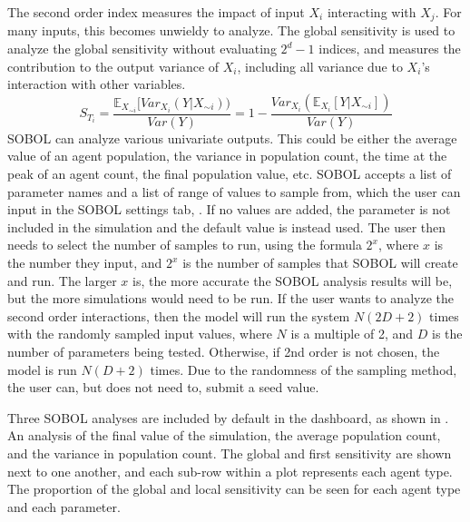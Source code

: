 The second order index measures the impact of input $X_i$ interacting with $X_j$. For many inputs, this becomes unwieldy to analyze.
The global sensitivity is used to analyze the global sensitivity without evaluating $2^d-1$ indices, and measures the contribution to the output variance of $X_i$, including all variance due to $X_i$'s interaction with other variables.
\[
    S_{T_i} = \frac{\mathbb{E}_{X_{\sim i}}[\textit{Var}_{X_i}(Y|X_{\sim i}))}{\textit{Var}(Y)} = 1 - \frac{\textit{Var}_{X_i}(\mathbb{E}_{X_i}[Y|X_{\sim i}])}{\textit{Var}(Y)}
\]
SOBOL can analyze various univariate outputs.
This could be either the average value of an agent population, the variance in population count, the time at the peak of an agent count, the final population value, etc. \newline
SOBOL accepts a list of parameter names and a list of range of values to sample from, which the user can input in the SOBOL settings tab, . 
If no values are added, the parameter is not included in the simulation and the default value is instead used. 
The user then needs to select the number of samples to run, using the formula $2^x$, where $x$ is the number they input, and $2^x$ is the number of samples that SOBOL will create and run.
The larger $x$ is, the more accurate the SOBOL analysis results will be, but the more simulations would need to be run. \newline
If the user wants to analyze the second order interactions, then the model will run the system $N(2D+2)$ times with the randomly sampled input values, where $N$ is a multiple of 2, and $D$ is the number of parameters being tested.
Otherwise, if 2nd order is not chosen, the model is run $N(D+2)$ times.
Due to the randomness of the sampling method, the user can, but does not need to, submit a seed value. 


Three SOBOL analyses are included by default in the dashboard, as shown in .
An analysis of the final value of the simulation, the average population count, and the variance in population count.
The global and first sensitivity are shown next to one another, and each sub-row within a plot represents each agent type. 
The proportion of the global and local sensitivity can be seen for each agent type and each parameter.

